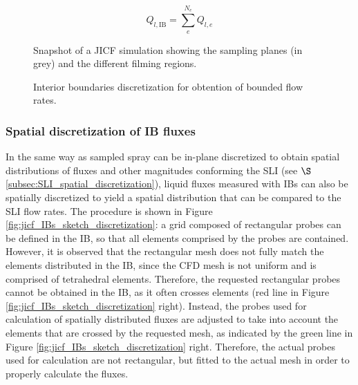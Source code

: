 \begin{equation}
\label{eq:Q_lIB_general_definition}
Q_{l,\mathrm{IB}} = \sum_{e}^{N_e} Q_{l,e}
\end{equation}

\begin{figure}[ht]
     \centering
     \caption{Snapshot of a JICF simulation showing the sampling planes (in grey) and the different filming regions.}
      \label{fig:jicf_interior_boundaries_surface_measurements}
\end{figure}

\begin{figure}[ht]
     \centering
     \caption{Interior boundaries discretization for obtention of bounded flow rates.}
      \label{fig:jicf_IBs_sketch_calculation}
\end{figure}

\subsubsection*{Spatial discretization of IB fluxes}

In the same way as sampled spray can be in-plane discretized to obtain spatial distributions of fluxes and other magnitudes conforming the SLI (see $\S$\ref{subsec:SLI_spatial_discretization}), liquid fluxes measured with IBs can also be spatially discretized to yield a spatial distribution that can be compared to the SLI flow rates. The procedure is shown in Figure \ref{fig:jicf_IBs_sketch_discretization}: a grid composed of rectangular probes can be defined in the IB, so that all elements comprised by the probes are contained. However, it is observed that the rectangular mesh does not fully match the elements distributed in the IB, since the CFD mesh is not uniform and is comprised of tetrahedral elements. Therefore, the requested rectangular probes cannot be obtained in the IB, as it often crosses elements (red line in Figure \ref{fig:jicf_IBs_sketch_discretization} right). Instead, the probes used for calculation of spatially distributed fluxes are adjusted to take into account the elements that are crossed by the requested mesh, as indicated by the green line in Figure \ref{fig:jicf_IBs_sketch_discretization} right. Therefore, the actual probes used for calculation are not rectangular, but fitted to the actual mesh in order to properly calculate the fluxes.


